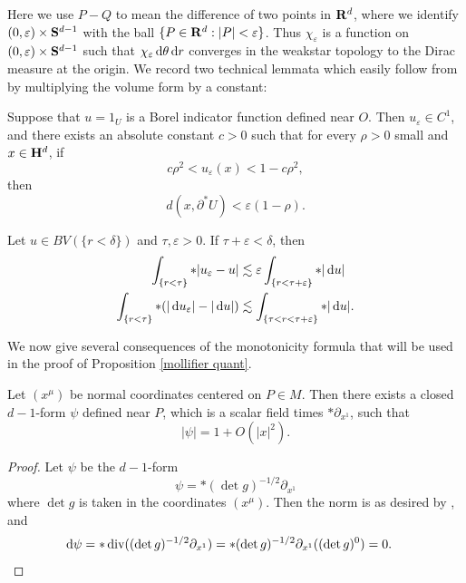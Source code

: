 Here we use $P - Q$ to mean the difference of two points in $\mathbf{R}^d$, where we identify $(0, \varepsilon) \times \mathbf S^{d - 1}$ with the ball $\{P \in \mathbf{R}^d: |P| < \varepsilon\}$.
Thus $\chi_\varepsilon$ is a function on $(0, \varepsilon) \times \mathbf S^{d - 1}$ such that $\chi_\varepsilon \mathop{}\!\mathrm{d} \theta \mathop{}\!\mathrm{d} r$ converges in the weakstar topology to the Dirac measure at the origin.
We record two technical lemmata which easily follow from \cite[Lemmata 7.1--7.2]{Giusti77} by multiplying the volume form by a constant:

\begin{lemma}\label{Giusti71}
Suppose that $u = 1_U$ is a Borel indicator function defined near $O$. Then $u_\varepsilon \in C^1$, and there exists an absolute constant $c > 0$ such that for every $\rho > 0$ small and $x \in \mathbf H^d$, if
$$c\rho^2 < u_\varepsilon(x) < 1 - c\rho^2,$$
then
\begin{equation}\label{Giusti71 claim}
d(x, \partial^* U) < \varepsilon(1 - \rho).
\end{equation}
\end{lemma}

\begin{lemma}\label{Giusti72}
Let $u \in BV(\{r < \delta\})$ and $\tau, \varepsilon > 0$. If $\tau + \varepsilon < \delta$, then
\begin{align*}
\int_{\{r < \tau\}} *|u_\varepsilon - u| &\lesssim \varepsilon \int_{\{r < \tau + \varepsilon\}} *|\mathop{}\!\mathrm{d} u|\\
\int_{\{r < \tau\}} *(|\mathop{}\!\mathrm{d} u_\varepsilon| - |\mathop{}\!\mathrm{d} u|) &\lesssim \int_{\{\tau < r < \tau + \varepsilon\}} *|\mathop{}\!\mathrm{d} u|.
\end{align*}
\end{lemma}

We now give several consequences of the monotonicity formula that will be used in the proof of Proposition \ref{mollifier quant}.

\begin{lemma}\label{closed 1-form for normal}
Let $(x^\mu)$ be normal coordinates centered on $P \in M$.
Then there exists a closed $d-1$-form $\psi$ defined near $P$, which is a scalar field times $*\partial_{x^1}$, such that
\begin{equation}\label{norm of good d1 form}|\psi| = 1 + O(|x|^2).\end{equation}
\end{lemma}
\begin{proof}
Let $\psi$ be the $d-1$-form
$$\psi = *(\det g)^{-1/2} \partial_{x^1}$$
where $\det g$ is taken in the coordinates $(x^\mu)$. Then the norm is as desired by \cite[Lemma 3.4]{schoen1994lectures}, and
\begin{align*}
\mathop{}\!\mathrm{d} \psi &= *\operatorname{div}((\det g)^{-1/2} \partial_{x^1}) = *(\det g)^{-1/2} \partial_{x^1}((\det g)^0) = 0. \qedhere
\end{align*}
\end{proof}

